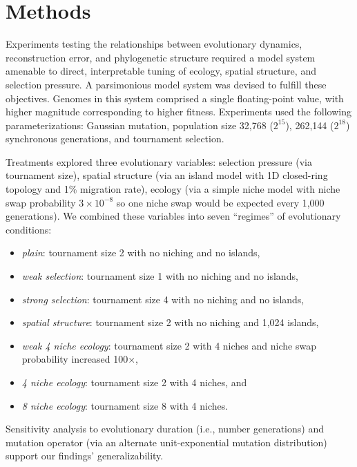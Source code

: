 \vspace{-1.5ex}
\section{Methods}

Experiments testing the relationships between evolutionary dynamics, reconstruction error, and phylogenetic structure required a model system amenable to direct, interpretable tuning of ecology, spatial structure, and selection pressure.
A parsimonious model system was devised to fulfill these objectives.
Genomes in this system comprised a single floating-point value, with higher magnitude corresponding to higher fitness.
Experiments used the following parameterizations: Gaussian mutation, population size 32,768 ($2^{15}$), 262,144 ($2^{18}$) synchronous generations, and tournament selection.

Treatments explored three evolutionary variables: selection pressure (via tournament size), spatial structure (via an island model with 1D closed-ring topology and 1\% migration rate), ecology (via a simple niche model with niche swap probability $3 \times 10^{-8}$ so one niche swap would be expected every 1,000 generations).
We combined these variables into seven ``regimes'' of evolutionary conditions:

\begin{minipage}[t]{\columnwidth}
  \begin{itemize}
    \item \textit{plain}: tournament size 2 with no niching and no islands,
    \item \textit{weak selection}: tournament size 1 with no niching and no islands,
    \item \textit{strong selection}: tournament size 4 with no niching and no islands,
    \item \textit{spatial structure}: tournament size 2 with no niching and 1,024 islands,
    \item \textit{weak 4 niche ecology}: tournament size 2 with 4 niches and niche swap probability increased 100$\times$,
    \item \textit{4 niche ecology}: tournament size 2 with 4 niches, and
    \item \textit{8 niche ecology}: tournament size 8 with 4 niches.
  \end{itemize}
\end{minipage}

Sensitivity analysis to evolutionary duration (i.e., number generations) and mutation operator (via an alternate unit-exponential mutation distribution) support our findings' generalizability.

